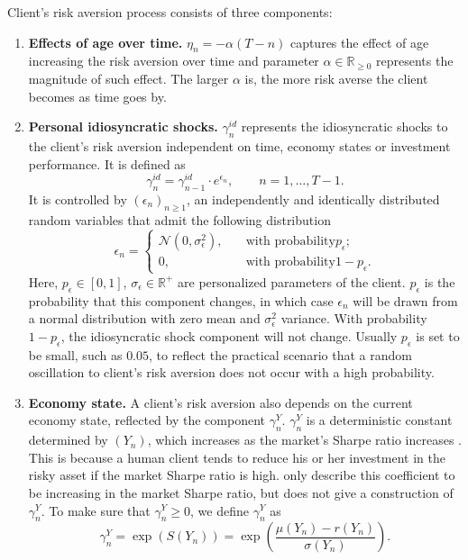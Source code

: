 Client's risk aversion process consists of three components:\begin{enumerate}
    \item \textbf{Effects of age over time.} $\eta_n=-\alpha(T-n)$ captures the effect of age increasing the risk aversion over time and parameter $\alpha\in\mathbb{R}_{\geq0}$ represents the magnitude of such effect. The larger $\alpha$ is, the more risk averse the client becomes as time goes by.
    \item \textbf{Personal idiosyncratic shocks.} $\gamma_n^{id}$ represents the idiosyncratic shocks to the client’s risk aversion independent on time, economy states or investment performance. It is defined as\begin{equation}\label{eq:gamma_id}
        \gamma_{n}^{id}=\gamma_{n-1}^{id}\cdot e^{\epsilon_{n}},\qquad n=1,\ldots,T-1.
    \end{equation}It is controlled by $(\epsilon_n)_{n\geq1}$, an independently and identically distributed random variables that admit the following distribution \begin{equation}\label{eq:eps}
        \epsilon_n=\begin{cases}
            \mathcal{N}(0,\sigma^2_\epsilon),\quad &\text{with probability} p_\epsilon;\\
            0,\quad&\text{with probability} 1-p_\epsilon.
        \end{cases}
    \end{equation}
    Here, $p_\epsilon\in[0,1]$, $\sigma_\epsilon\in\mathbb{R}^+$ are personalized parameters of the client. $p_\epsilon$ is the probability that this component changes, in which case $\epsilon_n$ will be drawn from a normal distribution with zero mean and $\sigma_\epsilon^2$ variance. With probability $1-p_\epsilon$, the idiosyncratic shock component will not change. Usually $p_\epsilon$ is set to be small, such as $0.05$, to reflect the practical scenario that a random oscillation to client's risk aversion does not occur with a high probability. 
    \item \textbf{Economy state.} A client's risk aversion also depends on the current economy state, reflected by the component $\gamma_n^Y$. $\gamma_n^Y$ is a deterministic constant determined by $(Y_n)$, which increases as the market's Sharpe ratio increases \cite{lettau2010measuring}. This is because a human client tends to reduce his or her investment in the risky asset if the market Sharpe ratio is high.  only describe this coefficient to be increasing in the market Sharpe ratio, but does not give a construction of $\gamma_n^Y$. To make sure that $\gamma_n^Y\geq0$, we define $\gamma_n^Y$ as \begin{equation}\label{eq:gamma_y}
        \gamma_n^Y=\exp(S(Y_n))=\exp{\left(\frac{\mu(Y_n)-r(Y_n)}{\sigma(Y_n)}\right)}.
    \end{equation}
\end{enumerate}


